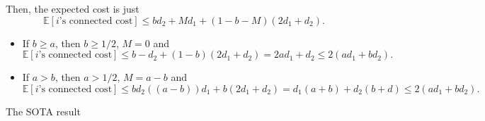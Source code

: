 Then, the expected cost is just
\[
	\mathbb{E}\left[\text{\(i\)'s connected cost}\right] \leq b d_2 + Md_1 + (1 - b - M) (2d_1 + d_2).
\]

\begin{itemize}
	\item If \(b \geq a\), then \(b \geq 1 / 2\), \(M = 0\) and
	      \[
		      \mathbb{E}\left[\text{\(i\)'s connected cost}\right] \leq b - d_2 + (1 - b)	(2 d_1 + d_2) = 2ad_1 + d_2 \leq 2(ad_1 + bd_2).
	      \]
	\item If \(a > b\), then \(a > 1 / 2\), \(M = a - b\) and
	      \[
		      \mathbb{E}\left[\text{\(i\)'s connected cost}\right] \leq bd_2 ( (a - b))d_1 + b(2d_1 + d_2) = d_1(a+b)+d_2(b+d) \leq 2(ad_1 + bd_2).
	      \]
\end{itemize}

\begin{remark}[SOTA]
	The SOTA result
\end{remark}